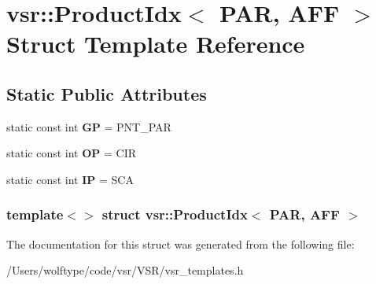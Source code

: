 \hypertarget{structvsr_1_1_product_idx_3_01_p_a_r_00_01_a_f_f_01_4}{\section{vsr\-:\-:Product\-Idx$<$ P\-A\-R, A\-F\-F $>$ Struct Template Reference}
\label{structvsr_1_1_product_idx_3_01_p_a_r_00_01_a_f_f_01_4}
}
\subsection*{Static Public Attributes}
\begin{DoxyCompactItemize}
\item 
\hypertarget{structvsr_1_1_product_idx_3_01_p_a_r_00_01_a_f_f_01_4_a664d5ec68880d18f62bfcb9aab9bc221}{static const int {\bfseries G\-P} = P\-N\-T\-\_\-\-P\-A\-R}\label{structvsr_1_1_product_idx_3_01_p_a_r_00_01_a_f_f_01_4_a664d5ec68880d18f62bfcb9aab9bc221}

\item 
\hypertarget{structvsr_1_1_product_idx_3_01_p_a_r_00_01_a_f_f_01_4_a7ac086376f5b0cde3717d8bac90ecb57}{static const int {\bfseries O\-P} = C\-I\-R}\label{structvsr_1_1_product_idx_3_01_p_a_r_00_01_a_f_f_01_4_a7ac086376f5b0cde3717d8bac90ecb57}

\item 
\hypertarget{structvsr_1_1_product_idx_3_01_p_a_r_00_01_a_f_f_01_4_ad03e08b4b041d46f417497688931fba8}{static const int {\bfseries I\-P} = S\-C\-A}\label{structvsr_1_1_product_idx_3_01_p_a_r_00_01_a_f_f_01_4_ad03e08b4b041d46f417497688931fba8}

\end{DoxyCompactItemize}
\subsubsection*{template$<$$>$ struct vsr\-::\-Product\-Idx$<$ P\-A\-R, A\-F\-F $>$}



The documentation for this struct was generated from the following file\-:\begin{DoxyCompactItemize}
\item 
/\-Users/wolftype/code/vsr/\-V\-S\-R/vsr\-\_\-templates.\-h\end{DoxyCompactItemize}
